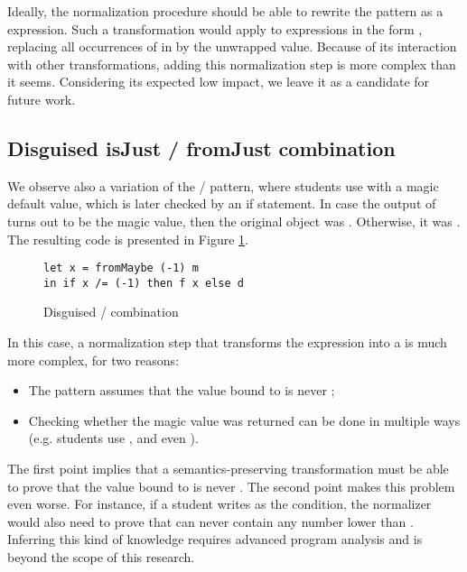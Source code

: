 Ideally, the normalization procedure should be able to rewrite the  pattern as a  expression. Such a transformation would apply to expressions in the form , replacing all occurrences of  in  by the unwrapped value. Because of its interaction with other transformations, adding this normalization step is more complex than it seems. Considering its expected low impact, we leave it as a candidate for future work.

\subsection{Disguised isJust / fromJust combination}

We observe also a variation of the  /  pattern, where students use  with a magic default value, which is later checked by an if statement. In case the output of  turns out to be the magic value, then the original  object was . Otherwise, it was . The resulting code is presented in Figure \ref{fig:maybe-isjust-fromjust-disguised}.

\begin{figure}
\centering
\begin{verbatim}
let x = fromMaybe (-1) m
in if x /= (-1) then f x else d
\end{verbatim}
\caption{Disguised  /  combination}
\label{fig:maybe-isjust-fromjust-disguised}
\end{figure}

In this case, a normalization step that transforms the expression into a  is much more complex, for two reasons:

\begin{itemize}
    \item The pattern assumes that the value bound to  is never ;
    \item Checking whether the magic value was returned can be done in multiple ways (e.g. students use \haskell{(==)}, \haskell{(/=)} and even \haskell{(>)}).
\end{itemize}

The first point implies that a semantics-preserving transformation must be able to prove that the value bound to  is never . The second point makes this problem even worse. For instance, if a student writes  as the  condition, the normalizer would also need to prove that  can never contain any number lower than . Inferring this kind of knowledge requires advanced program analysis and is beyond the scope of this research.


